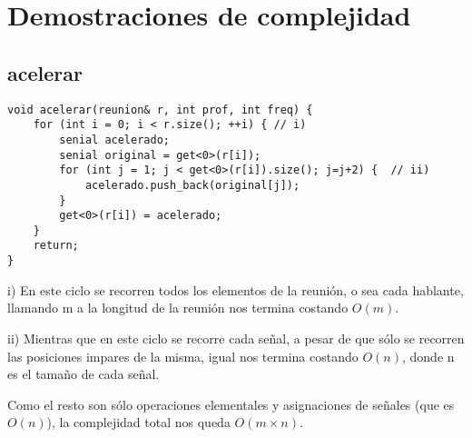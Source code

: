 \documentclass{article}
\begin{document}
\maketitle

\tableofcontents
\newpage


\newpage
{}
\section*{Demostraciones de complejidad}
\vspace{0.5cm}
\subsection{acelerar}
\begin{lstlisting}
void acelerar(reunion& r, int prof, int freq) {
    for (int i = 0; i < r.size(); ++i) { // i)
        senial acelerado;
        senial original = get<0>(r[i]);
        for (int j = 1; j < get<0>(r[i]).size(); j=j+2) {  // ii)
            acelerado.push_back(original[j]);
        }
        get<0>(r[i]) = acelerado;
    }
    return;
}
\end{lstlisting}
i) En este ciclo se recorren todos los elementos de la reunión, o sea cada hablante, llamando m a la longitud de la reunión nos termina costando $O(m)$.

ii) Mientras que en este ciclo se recorre cada señal, a pesar de que sólo se recorren las posiciones impares de la misma, igual nos termina costando $O(n)$, donde n es el tamaño de cada señal.

Como el resto son sólo operaciones elementales y asignaciones de señales (que es $O(n)$), la complejidad total nos queda $O(m \times n)$.


\newpage
\end{document}
